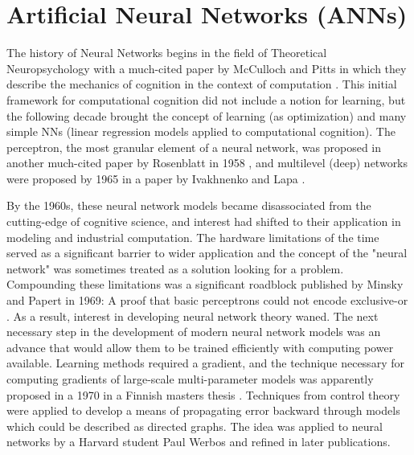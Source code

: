 \documentclass[10pt]{extarticle}
\begin{document}
\section{Artificial Neural Networks (ANNs)}


The history of Neural Networks begins in the field of Theoretical Neuropsychology with a much-cited paper by McCulloch and Pitts in which they describe the mechanics of cognition in the context of computation \cite{mcculloch1943logical}. This initial framework for computational cognition did not include a notion for learning, but the following decade brought the concept of learning (as optimization) and many simple NNs (linear regression models applied to computational cognition). The perceptron, the most granular element of a neural network, was proposed in another much-cited paper by Rosenblatt in 1958 \cite{rosenblatt1958perceptron}, and multilevel (deep) networks were proposed by 1965 in a paper by Ivakhnenko and Lapa \cite{ivakhnenko1965cybernetic}. 

By the 1960s, these neural network models became disassociated from the cutting-edge of cognitive science, and interest had shifted to their application in modeling and industrial computation. The hardware limitations of the time served as a significant barrier to wider application and the concept of the "neural network" was sometimes treated as a solution looking for a problem. Compounding these limitations was a significant roadblock published by Minsky and Papert in 1969: A proof that basic perceptrons could not encode exclusive-or \cite{minsky1969perceptrons}. As a result, interest in developing neural network theory waned. The next necessary step in the development of modern neural network models was an advance that would allow them to be trained efficiently with computing power available. Learning methods required a gradient, and the technique necessary for computing gradients of large-scale multi-parameter models was apparently proposed in a 1970 in a Finnish masters thesis \cite{linnainmaa1970representation}. Techniques from control theory were applied to develop a means of propagating error backward through models which could be described as directed graphs. The idea was applied to neural networks by a Harvard student Paul Werbos\cite{werbos1974beyond} and refined in later publications. 
\end{document}
